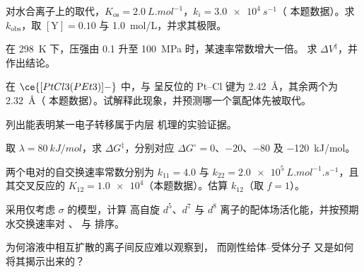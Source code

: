\begin{exercise}[$\star\star$]\label{exo:b3:complex-mechanisms:5}
对水合离子上的取代，$K_{\mathrm{os}} = \qty{2.0}{L.mol^{-1}}$，$k_i = \qty{3.0e4}{s^{-1}}$（
本题数据）。求 $k_{\mathrm{obs}}$，取 $[\mathrm Y] = 0.10$ 与 \qty{1.0}{mol/L}，并求其极限。
\end{exercise}

\begin{exercise}[$\star\star$]\label{exo:b3:complex-mechanisms:6}
在 \qty{298}{K} 下，压强由 0.1 升至 \qty{100}{MPa} 时，某速率常数增大一倍。
求 $\Delta V^{\ddagger}$，并作出结论。
\end{exercise}

\begin{exercise}[$\star\star$]\label{exo:b3:complex-mechanisms:7}
在 $\ce{[PtCl3(PEt3)]-}$ 中，与  呈反位的 Pt--Cl 键为 \qty{2.42}{\angstrom}，其余两个为 \qty{2.32}{\angstrom}（
本题数据）。试解释此现象，并预测哪一个氯配体先被取代。
\end{exercise}

\begin{exercise}[$\star\star$]\label{exo:b3:complex-mechanisms:8}
列出能表明某一电子转移属于内层
机理的实验证据。
\end{exercise}

\begin{exercise}[$\star\star$]\label{exo:b3:complex-mechanisms:9}
取 $\lambda = \qty{80}{kJ/mol}$，求 $\Delta G^{\ddagger}$，分别对应 $\Delta G^\circ = 0$、$-20$、$-80$ 及 \qty{-120}{kJ/mol}。
\end{exercise}

\begin{exercise}[$\star\star\star$]\label{exo:b3:complex-mechanisms:10}
两个电对的自交换速率常数分别为 $k_{11} = 4.0$ 与 $k_{22} = \qty{2.0e5}{L.mol^{-1}.s^{-1}}$，且
其交叉反应的 $K_{12} = \num{1.0e4}$（本题数据）。估算 $k_{12}$（取 $f = 1$）。
\end{exercise}

\begin{exercise}[$\star\star\star$]\label{exo:b3:complex-mechanisms:11}
采用仅考虑 $\sigma$ 的模型，计算
高自旋 $d^5$、$d^7$ 与 $d^8$ 离子的配体场活化能，并按预期水交换速率对
、 与  排序。
\end{exercise}

\begin{exercise}[$\star\star\star$]\label{exo:b3:complex-mechanisms:12}
为何溶液中相互扩散的离子间反应难以观察到，
而刚性给体–受体分子
又是如何将其揭示出来的？
\end{exercise}

